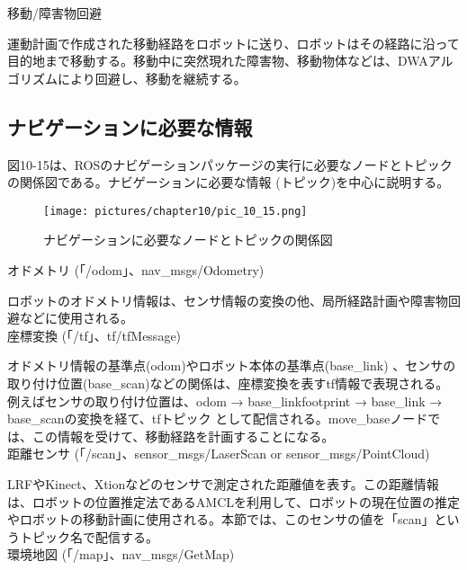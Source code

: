 \circled{\thenum} 移動/障害物回避

運動計画で作成された移動経路をロボットに送り、ロボットはその経路に沿って目的地まで移動する。移動中に突然現れた障害物、移動物体などは、DWAアルゴリズムにより回避し、移動を継続する。\\

\subsection{ナビゲーションに必要な情報}

図10-15は、ROSのナビゲーションパッケージの実行に必要なノードとトピックの関係図である。ナビゲーションに必要な情報 (トピック)を中心に説明する。\\

\begin{figure}[htp]
  \centering
  \texttt{[image: pictures/chapter10/pic\_10\_15.png]}
  \caption{ナビゲーションに必要なノードとトピックの関係図}
\end{figure}

\setcounter{num}{0}

\circled{\thenum} オドメトリ (「/odom」、nav\_msgs/Odometry)

ロボットのオドメトリ情報は、センサ情報の変換の他、局所経路計画や障害物回避などに使用される。\\

\circled{\thenum} 座標変換 (「/tf」、tf/tfMessage)

オドメトリ情報の基準点(odom)やロボット本体の基準点(base\_link)  、センサの取り付け位置(base\_scan)などの関係は、座標変換を表すtf情報で表現される。例えばセンサの取り付け位置は、odom → base\_linkfootprint → base\_link → base\_scanの変換を経て、tfトピック  として配信される。move\_baseノードでは、この情報を受けて、移動経路を計画することになる。\\

\circled{\thenum} 距離センサ (「/scan」、sensor\_msgs/LaserScan or sensor\_msgs/PointCloud)

LRFやKinect、Xtionなどのセンサで測定された距離値を表す。この距離情報は、ロボットの位置推定法であるAMCLを利用して、ロボットの現在位置の推定やロボットの移動計画に使用される。本節では、このセンサの値を「scan」というトピック名で配信する。\\

\circled{\thenum} 環境地図 (「/map」、nav\_msgs/GetMap)

